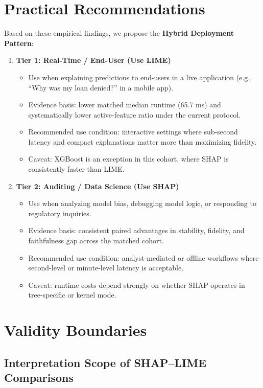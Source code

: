 \documentclass[twoside,11pt]{article}
\begin{document}
\section{Practical Recommendations}

Based on these empirical findings, we propose the \textbf{Hybrid
Deployment Pattern}:

\begin{enumerate}[leftmargin=*]
\item \textbf{Tier 1: Real-Time / End-User (Use LIME)}
\begin{itemize}[leftmargin=*]
\item Use when explaining predictions to end-users in a live application
(e.g., ``Why was my loan denied?'' in a mobile app).
\item Evidence basis: lower matched median runtime (65.7 ms) and
systematically lower active-feature ratio under the current protocol.
\item Recommended use condition: interactive settings where sub-second
latency and compact explanations matter more than maximizing fidelity.
\item Caveat: XGBoost is an exception in this cohort, where SHAP is
consistently faster than LIME.
\end{itemize}
\item \textbf{Tier 2: Auditing / Data Science (Use SHAP)}
\begin{itemize}[leftmargin=*]
\item Use when analyzing model bias, debugging model logic, or responding
to regulatory inquiries.
\item Evidence basis: consistent paired advantages in stability,
fidelity, and faithfulness gap across the matched cohort.
\item Recommended use condition: analyst-mediated or offline workflows
where second-level or minute-level latency is acceptable.
\item Caveat: runtime costs depend strongly on whether SHAP operates in
tree-specific or kernel mode.
\end{itemize}
\end{enumerate}

\section{Validity Boundaries}

\subsection{Interpretation Scope of SHAP--LIME Comparisons}
\label{sec:interpretation_scope}
\end{document}
